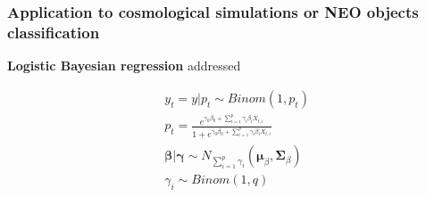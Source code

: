 \documentclass{beamer}
\begin{document}
\begin{frame}

\frametitle{Application to cosmological simulations or NEO objects classification}

\begin{center}
\textbf{Logistic Bayesian regression} addressed 
\end{center}


\begin{eqnarray}
&y_t = y|p_t \sim  Binom(1,p_t) \\
&p_t = \frac{e^{\gamma_0\beta_0 + \sum_{i=1}^{p} \gamma_i\beta_{i}X_{t,i}}}{1+e^{\gamma_0\beta_0 + \sum_{i=1}^{p} \gamma_i\beta_{i}X_{t,i}}}\\
&\boldsymbol\beta|\boldsymbol\gamma \sim N_{\sum_{i=1}^p{\gamma_i}}(\boldsymbol\mu_\beta,\boldsymbol\Sigma_{\beta})\\
&\gamma_i \sim Binom(1,q)\label{gammaprior}
\end{eqnarray}

\end{frame}
\end{document}
